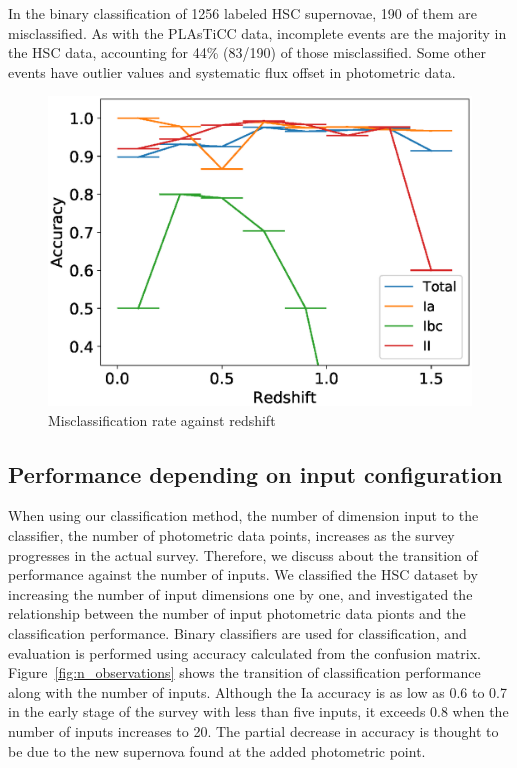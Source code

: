 \documentclass[useamsfonts]{pasj01}
\begin{document}
In the binary classification of 1256 labeled HSC supernovae, 190 of them are misclassified.
As with the PLAsTiCC data, incomplete events are the majority in the HSC data, accounting for 44\% (83/190) of those misclassified.
Some other events have outlier values and systematic flux offset in photometric data.
%
\begin{figure}[ht]
  \begin{center}
     \includegraphics[width=\columnwidth]{figures/misclass_rate_plastic_3class.eps}
  \end{center}
  \caption{%
  Misclassification rate against redshift
  }%
  \label{fig:misclass_rate_3class}
\end{figure}
%
%
\subsection{Performance depending on input configuration}
%
When using our classification method, the number of dimension input to the classifier, the number of photometric data points, increases as the survey progresses in the actual survey.
Therefore, we discuss about the transition of performance against the number of inputs.
We classified the HSC dataset by increasing the number of input dimensions one by one, and investigated the relationship between the number of input photometric data pionts and the classification performance.
Binary classifiers are used for classification, and evaluation is performed using accuracy calculated from the confusion matrix.
Figure\ \ref{fig:n_observations} shows the transition of classification performance along with the number of inputs.
Although the Ia accuracy is as low as 0.6 to 0.7 in the early stage of the survey with less than five inputs, it exceeds 0.8 when the number of inputs increases to 20.
The partial decrease in accuracy is thought to be due to the new supernova found at the added photometric point.
\end{document}
